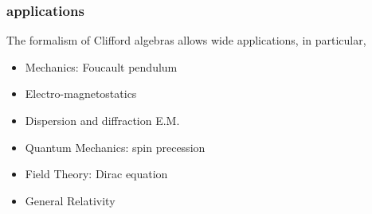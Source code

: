 \label{applications}
\begin{frame}\frametitle{applications}

The formalism of Clifford algebras allows wide applications, in particular,

\begin{itemize}
 \item 
 Mechanics:  Foucault pendulum
 \item 

Electro-magnetostatics
 \item 

Dispersion and diffraction E.M.
 \item 

Quantum Mechanics: spin precession 
 \item 

Field Theory: Dirac equation 
 \item 

General Relativity
\end{itemize}


\end{frame}
